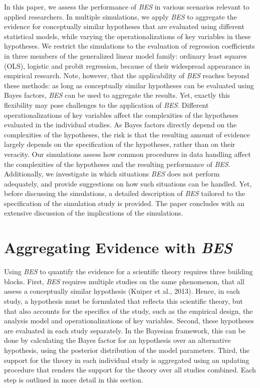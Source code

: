 \documentclass[
]{interact}
\begin{document}
In this paper, we assess the performance of \emph{BES} in various
scenarios relevant to applied researchers. In multiple simulations, we
apply \emph{BES} to aggregate the evidence for conceptually similar
hypotheses that are evaluated using different statistical models, while
varying the operationalizations of key variables in these hypotheses. We
restrict the simulations to the evaluation of regression coefficients in
three members of the generalized linear model family: ordinary least
squares (OLS), logistic and probit regression, because of their
widespread appearance in empirical research. Note, however, that the
applicability of \emph{BES} reaches beyond these methods: as long as
conceptually similar hypotheses can be evaluated using Bayes factors,
\emph{BES} can be used to aggregate the results. Yet, exactly this
flexibility may pose challenges to the application of \emph{BES}.
Different operationalizations of key variables affect the complexities
of the hypotheses evaluated in the individual studies. As Bayes factors
directly depend on the complexities of the hypotheses, the risk is that
the resulting amount of evidence largely depends on the specification of
the hypotheses, rather than on their veracity. Our simulations assess
how common procedures in data handling affect the complexities of the
hypotheses and the resulting performance of \emph{BES}. Additionally, we
investigate in which situations \emph{BES} does not perform adequately,
and provide suggestions on how such situations can be handled. Yet,
before discussing the simulations, a detailed description of \emph{BES}
tailored to the specification of the simulation study is provided. The
paper concludes with an extensive discussion of the implications of the
simulations.

\hypertarget{aggregating-evidence-with-bes}{%
\section{\texorpdfstring{Aggregating Evidence with
\emph{BES}}{Aggregating Evidence with BES}}\label{aggregating-evidence-with-bes}}

Using \emph{BES} to quantify the evidence for a scientific theory
requires three building blocks. First, \emph{BES} requires multiple
studies on the same phenomenon, that all assess a conceptually similar
hypothesis (Kuiper et al., 2013). Hence, in each study, a hypothesis
must be formulated that reflects this scientific theory, but that also
accounts for the specifics of the study, such as the empirical design,
the analysis model and operationalizations of key variables. Second,
these hypotheses are evaluated in each study separately. In the Bayesian
framework, this can be done by calculating the Bayes factor for an
hypothesis over an alternative hypothesis, using the posterior
distribution of the model parameters. Third, the support for the theory
in each individual study is aggregated using an updating procedure that
renders the support for the theory over all studies combined. Each step
is outlined in more detail in this section.
\end{document}
